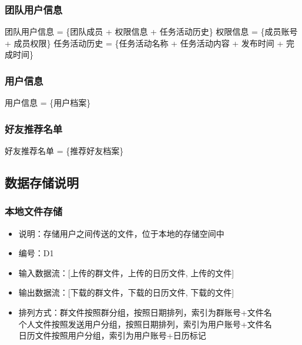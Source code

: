             \subsubsection{团队用户信息}
                团队用户信息 = \{团队成员 + 权限信息 + 任务活动历史\}
                权限信息 = \{成员账号 + 成员权限\}
                任务活动历史 = \{任务活动名称 + 任务活动内容 + 发布时间 + 完成时间\}
            \subsubsection{用户信息}
                用户信息 = \{用户档案\}
            \subsubsection{好友推荐名单}
                好友推荐名单 = \{推荐好友档案\}
            

        \subsection{数据存储说明}
            \subsubsection{本地文件存储}
            \begin{itemize}
                \item 说明：存储用户之间传送的文件，位于本地的存储空间中
                \item 编号：D1
                \item 输入数据流：[上传的群文件，上传的日历文件, 上传的文件]
                \item 输出数据流：[下载的群文件，下载的日历文件, 下载的文件]
                \item 排列方式：群文件按照群分组，按照日期排列，索引为群账号+文件名\\
                               个人文件按照发送用户分组，按照日期排列，索引为用户账号+文件名\\
                               日历文件按照用户分组，索引为用户账号+日历标记\\
            \end{itemize}
